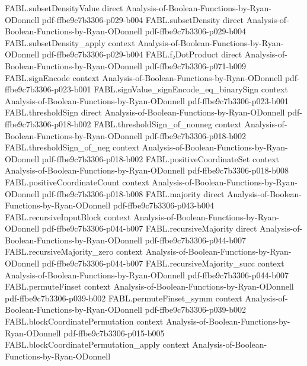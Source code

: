 \begin{theorem}
  {FABL.subsetDensityValue}
  {direct}
  {Analysis-of-Boolean-Functions-by-Ryan-ODonnell}
  {pdf-ffbe9c7b3306-p029-b004}
\proofstep
  {FABL.subsetDensity}
  {direct}
  {Analysis-of-Boolean-Functions-by-Ryan-ODonnell}
  {pdf-ffbe9c7b3306-p029-b004}
\proofstep
  {FABL.subsetDensity_apply}
  {context}
  {Analysis-of-Boolean-Functions-by-Ryan-ODonnell}
  {pdf-ffbe9c7b3306-p029-b004}
\proofstep
  {FABL.f₂DotProduct}
  {direct}
  {Analysis-of-Boolean-Functions-by-Ryan-ODonnell}
  {pdf-ffbe9c7b3306-p071-b009}
\proofstep
  {FABL.signEncode}
  {context}
  {Analysis-of-Boolean-Functions-by-Ryan-ODonnell}
  {pdf-ffbe9c7b3306-p023-b001}
\proofstep
  {FABL.signValue_signEncode_eq_binarySign}
  {context}
  {Analysis-of-Boolean-Functions-by-Ryan-ODonnell}
  {pdf-ffbe9c7b3306-p023-b001}
\proofstep
  {FABL.thresholdSign}
  {direct}
  {Analysis-of-Boolean-Functions-by-Ryan-ODonnell}
  {pdf-ffbe9c7b3306-p018-b002}
\proofstep
  {FABL.thresholdSign_of_nonneg}
  {context}
  {Analysis-of-Boolean-Functions-by-Ryan-ODonnell}
  {pdf-ffbe9c7b3306-p018-b002}
\proofstep
  {FABL.thresholdSign_of_neg}
  {context}
  {Analysis-of-Boolean-Functions-by-Ryan-ODonnell}
  {pdf-ffbe9c7b3306-p018-b002}
\proofstep
  {FABL.positiveCoordinateSet}
  {context}
  {Analysis-of-Boolean-Functions-by-Ryan-ODonnell}
  {pdf-ffbe9c7b3306-p018-b008}
\proofstep
  {FABL.positiveCoordinateCount}
  {context}
  {Analysis-of-Boolean-Functions-by-Ryan-ODonnell}
  {pdf-ffbe9c7b3306-p018-b008}
\proofstep
  {FABL.majority}
  {direct}
  {Analysis-of-Boolean-Functions-by-Ryan-ODonnell}
  {pdf-ffbe9c7b3306-p043-b004}
\proofstep
  {FABL.recursiveInputBlock}
  {context}
  {Analysis-of-Boolean-Functions-by-Ryan-ODonnell}
  {pdf-ffbe9c7b3306-p044-b007}
\proofstep
  {FABL.recursiveMajority}
  {direct}
  {Analysis-of-Boolean-Functions-by-Ryan-ODonnell}
  {pdf-ffbe9c7b3306-p044-b007}
\proofstep
  {FABL.recursiveMajority_zero}
  {context}
  {Analysis-of-Boolean-Functions-by-Ryan-ODonnell}
  {pdf-ffbe9c7b3306-p044-b007}
\proofstep
  {FABL.recursiveMajority_succ}
  {context}
  {Analysis-of-Boolean-Functions-by-Ryan-ODonnell}
  {pdf-ffbe9c7b3306-p044-b007}
\proofstep
  {FABL.permuteFinset}
  {context}
  {Analysis-of-Boolean-Functions-by-Ryan-ODonnell}
  {pdf-ffbe9c7b3306-p039-b002}
\proofstep
  {FABL.permuteFinset_symm}
  {context}
  {Analysis-of-Boolean-Functions-by-Ryan-ODonnell}
  {pdf-ffbe9c7b3306-p039-b002}
\proofstep
  {FABL.blockCoordinatePermutation}
  {context}
  {Analysis-of-Boolean-Functions-by-Ryan-ODonnell}
  {pdf-ffbe9c7b3306-p015-b005}
\proofstep
  {FABL.blockCoordinatePermutation_apply}
  {context}
  {Analysis-of-Boolean-Functions-by-Ryan-ODonnell}

\end{theorem}
